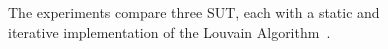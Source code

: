     
    \begin{figure}[h!]
        \begin{center}
            
            \caption{The experiments compare three \acs{SUT}, each with a static and iterative implementation of the Louvain Algorithm~\cite{Blondel2008}.}
            \label{Figure:experiment-specification}
        \end{center}
    \end{figure}

